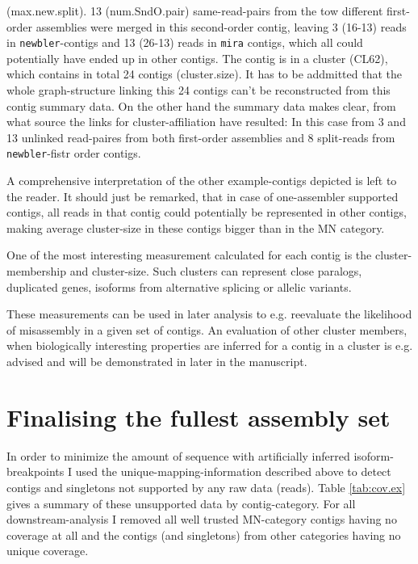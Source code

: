 (max.new.split). 13 (num.SndO.pair) same-read-pairs from the tow
different first-order assemblies were merged in this second-order
contig, leaving 3 (16-13) reads in \texttt{newbler}-contigs and 13
(26-13) reads in \texttt{mira} contigs, which all could potentially
have ended up in other contigs. The contig is in a cluster (CL62),
which contains in total 24 contigs (cluster.size). It has to be
addmitted that the whole graph-structure linking this 24 contigs can't
be reconstructed from this contig summary data. On the other hand the
summary data makes clear, from what source the links for
cluster-affiliation have resulted: In this case from 3 and 13 unlinked
read-paires from both first-order assemblies and 8 split-reads from
\texttt{newbler}-fistr order contigs.

A comprehensive interpretation of the other example-contigs depicted
is left to the reader. It should just be remarked, that in case of
one-assembler supported contigs, all reads in that contig could
potentially be represented in other contigs, making average
cluster-size in these contigs bigger than in the MN category.

One of the most interesting measurement calculated for each contig is
the cluster-membership and cluster-size. Such clusters can represent
close paralogs, duplicated genes, isoforms from alternative splicing
or allelic variants.

These measurements can be used in later analysis to e.g. reevaluate
the likelihood of misassembly in a given set of contigs. An evaluation
of other cluster members, when biologically interesting properties are
inferred for a contig in a cluster is e.g. advised and will be
demonstrated in later in the manuscript.


\section{Finalising the fullest assembly set}
\label{sec:final-full-assembly}

In order to minimize the amount of sequence with artificially inferred
isoform-breakpoints I used the unique-mapping-information described
above to detect contigs and singletons not supported by any raw data
(reads). Table \ref{tab:cov.ex} gives a summary of these unsupported
data by contig-category. For all downstream-analysis I removed all
well trusted MN-category contigs having no coverage at all and the
contigs (and singletons) from other categories having no unique
coverage.

